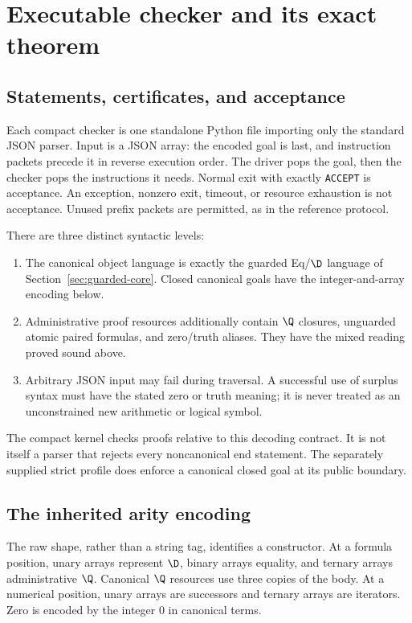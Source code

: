 \section{Executable checker and its exact theorem}
\label{sec:implementation}

\subsection{Statements, certificates, and acceptance}
Each compact checker is one standalone Python file importing only the
standard JSON parser. Input is a JSON array: the encoded goal is last,
and instruction packets precede it in reverse execution order. The
driver pops the goal, then the checker pops the instructions it needs.
Normal exit with exactly \texttt{ACCEPT} is acceptance. An exception,
nonzero exit, timeout, or resource exhaustion is not acceptance.
Unused prefix packets are permitted, as in the reference protocol.

There are three distinct syntactic levels:
\begin{enumerate}
\item The canonical object language is exactly the guarded Eq/$\D$
language of Section~\ref{sec:guarded-core}. Closed canonical goals have
the integer-and-array encoding below.
\item Administrative proof resources additionally contain $\Q$ closures,
unguarded atomic paired formulas, and zero/truth aliases. They have the
mixed reading proved sound above.
\item Arbitrary JSON input may fail during traversal. A successful use of
surplus syntax must have the stated zero or truth meaning; it is never
treated as an unconstrained new arithmetic or logical symbol.
\end{enumerate}
The compact kernel checks proofs relative to this decoding contract.
It is not itself a parser that rejects every noncanonical end statement.
The separately supplied strict profile does enforce a canonical closed
goal at its public boundary.

\subsection{The inherited arity encoding}
The raw shape, rather than a string tag, identifies a constructor. At a
formula position, unary arrays represent $\D$, binary arrays equality,
and ternary arrays administrative $\Q$. Canonical $\Q$ resources use
three copies of the body. At a numerical position, unary arrays are
successors and ternary arrays are iterators. Zero is encoded by the
integer $0$ in canonical terms.

